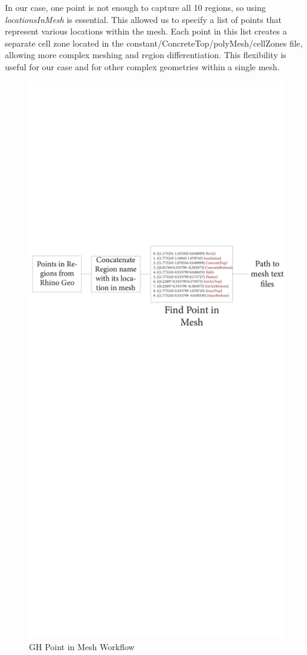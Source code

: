 In our case, one point is not enough to capture all 10 regions, so using \textit{locationsInMesh} is essential. This allowed us to specify a list of points that represent various locations within the mesh. Each point in this list creates a separate cell zone located in the \textrm{constant/ConcreteTop/polyMesh/cellZones} file, allowing more complex meshing and region differentiation. This flexibility is useful for our case and for other complex geometries within a single mesh.

\begin{figure}[tbh]
\centering
\includegraphics[trim=0cm 45cm 0cm 24cm, clip, width=0.8\linewidth]{Figures/locinmeshgh.pdf}
\hspace{0.7cm}
\caption{\gls{GH} Point in Mesh Workflow}
\label{locgh}
\end{figure}








